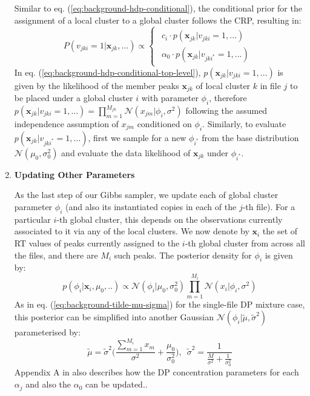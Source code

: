 \begin{enumerate}
Similar to eq. (\ref{eq:background-hdp-conditional}), the conditional prior for the assignment of a local cluster to a global cluster follows the CRP, resulting in:
\begin{dmath}
P(v_{jki}=1 \vert \boldsymbol{x}_{jk}, ...)\propto\begin{cases}
\begin{array}{c}
c_{i}\cdot p(\boldsymbol{x}_{jk} \vert v_{jki}=1,...)\\
\alpha_{0}\cdot p(\boldsymbol{x}_{jk} \vert v_{jki^{*}}=1,...)
\end{array}\end{cases}\label{eq:background-hdp-conditional-top-level}
\end{dmath}
In eq. (\ref{eq:background-hdp-conditional-top-level}), $p(\boldsymbol{x}_{jk} \vert v_{jki}=1,...)$ is given by the likelihood of the member peaks $\boldsymbol{x}_{jk}$ of local cluster $k$ in file $j$ to be placed under a global cluster $i$ with parameter $\phi_{i}$, therefore $p(\boldsymbol{x}_{jk} \vert v_{jki}=1,...) = \prod_{m=1}^{M_{jk}} \mathcal{N}(x_{jm} \vert \phi_{i}, \sigma^2)$ following the assumed independence assumption of $x_{jm}$ conditioned on $\phi_{i}$. Similarly, to evaluate $p(\boldsymbol{x}_{jk} \vert v_{jki^{*}}=1,...)$, first we sample for a new $\phi_{i^{*}}$ from the base distribution $\mathcal{N}(\mu_0, \sigma_0^2)$ and evaluate the data likelihood of $\boldsymbol{x}_{jk}$ under $\phi_{i^{*}}$. 

\item \textbf{Updating Other Parameters}

As the last step of our Gibbs sampler, we update each of global cluster parameter $\phi_i$ (and also its instantiated copies in each of the $j$-th file). For a particular $i$-th global cluster, this depends on the observations currently associated to it via any of the local clusters. We now denote by $\boldsymbol{x}_{i}$ the set of RT values of peaks currently assigned to the $i$-th global cluster from across all the files, and there are $M_i$ such peaks. The posterior density for $\phi_i$ is given by:
\begin{equation}
p(\phi_i \vert \boldsymbol{x}_i, \mu_0, ..) \propto \mathcal{N}(\phi_i \vert \mu_0, \sigma_0^2) \prod_{m=1}^{M_i} \mathcal{N}(x_i \vert \phi_i, \sigma^2)
\end{equation}
As in eq. (\ref{eq:background-tilde-mu-sigma}) for the single-file DP mixture case, this posterior can be simplified into another Gaussian $\mathcal{N}(\phi_i \vert \tilde{\mu}, \tilde{\sigma}^2)$ parameterised by:
\begin{equation}
\tilde{\mu} = \tilde{\sigma}^2 \bigg( \frac{\sum_{m=1}^{M_i} x_m}{\sigma^2} + \frac{\mu_0}{\sigma_0^2} \bigg), \enspace
\tilde{\sigma}^2 = \frac{1}{\frac{M}{\sigma^2} + \frac{1}{\sigma^2_0}} 
\label{eq:background-tilde-hdp-posterior}
\end{equation}
Appendix A in \cite{teh2005hierarchical} also describes how the DP concentration parameters for each $\alpha_j$ and also the $\alpha_0$ can be updated..

\end{enumerate}

